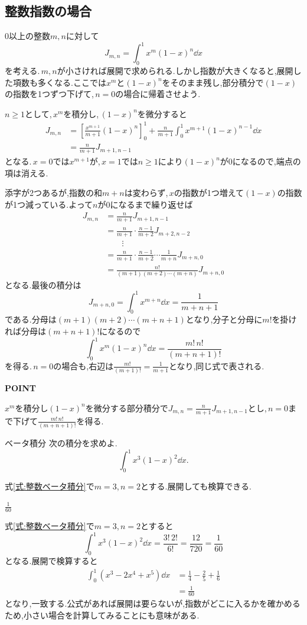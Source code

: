\subsection{整数指数の場合}

0以上の整数$m,n$に対して
\[
 J_{m,n}=\int_0^1x^m(1-x)^n\dd x
\]
を考える.\,$m,n$が小さければ展開で求められる.しかし指数が大きくなると,展開した項数も多くなる.ここでは$x^m$と$(1-x)^n$をそのまま残し,部分積分で$(1-x)$の指数を1つずつ下げて,\,$n=0$の場合に帰着させよう.

$n\ge1$として,\,$x^m$を積分し,\,$(1-x)^n$を微分すると
\begin{align*}
 J_{m,n}
 &=\left[\frac{x^{m+1}}{m+1}(1-x)^n\right]_0^1
   +\frac{n}{m+1}\int_0^1x^{m+1}(1-x)^{n-1}\dd x\\
 &=\frac{n}{m+1}J_{m+1,n-1}
\end{align*}
となる.\,$x=0$では$x^{m+1}$が,\,$x=1$では$n\ge1$により$(1-x)^n$が$0$になるので,端点の項は消える.

添字が2つあるが,指数の和$m+n$は変わらず,\,$x$の指数が1つ増えて$(1-x)$の指数が1つ減っている.よって$n$が$0$になるまで繰り返せば
\begin{align*}
 J_{m,n}
 &=\frac{n}{m+1}J_{m+1,n-1}\\
 &=\frac{n}{m+1}\cdot\frac{n-1}{m+2}J_{m+2,n-2}\\
 &\qquad\vdots\\
 &=\frac{n}{m+1}\cdot\frac{n-1}{m+2}\cdots\frac{1}{m+n}J_{m+n,0}\\
 &=\frac{n!}{(m+1)(m+2)\cdots(m+n)}J_{m+n,0}
\end{align*}
となる.最後の積分は
\[
 J_{m+n,0}=\int_0^1x^{m+n}\dd x=\frac1{m+n+1}
\]
である.分母は$(m+1)(m+2)\cdots(m+n+1)$となり,分子と分母に$m!$を掛ければ分母は$(m+n+1)!$になるので
\begin{equation}\label{式:整数ベータ積分}
 \boxed{
 \int_0^1x^m(1-x)^n\dd x=\frac{m!\,n!}{(m+n+1)!}}
\end{equation}
を得る.\,$n=0$の場合も,右辺は$\frac{m!}{(m+1)!}=\frac1{m+1}$となり,同じ式で表される.

\begin{bookpoint}
\textbf{POINT}\par
$x^m$を積分し$(1-x)^n$を微分する部分積分で$J_{m,n}=\frac{n}{m+1}J_{m+1,n-1}$とし,\,$n=0$まで下げて$\frac{m!\,n!}{(m+n+1)!}$を得る.
\end{bookpoint}

\begin{example}{ベータ積分}
次の積分を求めよ.
\[
 \int_0^1x^3(1-x)^2\dd x.
\]
\end{example}

式\eqref{式:整数ベータ積分}で$m=3$,\,$n=2$とする.展開しても検算できる.

$\frac1{60}$

式\eqref{式:整数ベータ積分}で$m=3$,\,$n=2$とすると
\[
 \int_0^1x^3(1-x)^2\dd x
 =\frac{3!\,2!}{6!}
 =\frac{12}{720}
 =\frac1{60}
\]
となる.展開で検算すると
\begin{align*}
 \int_0^1(x^3-2x^4+x^5)\dd x
 &=\frac14-\frac25+\frac16\\
 &=\frac1{60}
\end{align*}
となり,一致する.公式があれば展開は要らないが,指数がどこに入るかを確かめるため,小さい場合を計算してみることにも意味がある.
